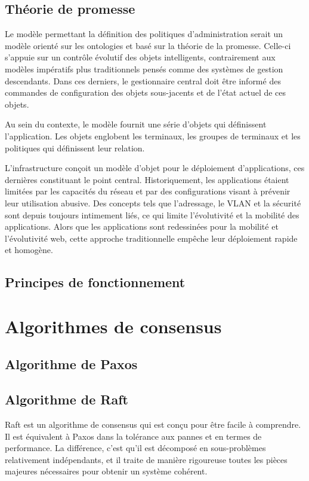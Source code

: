 \subsection{Théorie de promesse}

Le modèle permettant la définition des politiques d'administration serait un
modèle orienté sur les ontologies et basé sur la théorie de la promesse.
Celle-ci s'appuie sur un contrôle évolutif des objets intelligents,
contrairement aux modèles impératifs plus traditionnels pensés comme des
systèmes de gestion descendants.  Dans ces derniers, le gestionnaire central
doit être informé des commandes de configuration des objets sous-jacents et de
l'état actuel de ces objets.

Au sein du contexte, le modèle fournit une série d'objets qui définissent
l'application. Les objets englobent les terminaux, les groupes de terminaux et
les politiques qui définissent leur relation.

L'infrastructure conçoit un modèle d'objet pour le déploiement d'applications,
ces dernières constituant le point central. Historiquement, les applications
étaient limitées par les capacités du réseau et par des configurations visant à
prévenir leur utilisation abusive. Des concepts tels que l'adressage, le VLAN et
la sécurité sont depuis toujours intimement liés, ce qui limite l'évolutivité et
la mobilité des applications. Alors que les applications sont redessinées pour
la mobilité et l'évolutivité web, cette approche traditionnelle empêche leur
déploiement rapide et homogène.

\subsection{Principes de fonctionnement}

\section{Algorithmes de consensus}

\subsection{Algorithme de Paxos}

\subsection{Algorithme de Raft}

Raft est un algorithme de consensus qui est conçu pour être facile à comprendre.
Il est équivalent à Paxos dans la tolérance aux pannes et en termes de
performance. La différence, c'est qu'il est décomposé en sous-problèmes
relativement indépendants, et il traite de manière rigoureuse toutes les pièces
majeures nécessaires pour obtenir un système cohérent.

